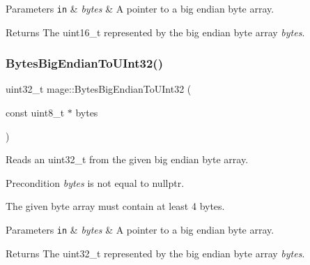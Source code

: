 \begin{DoxyParams}[1]{Parameters}
\mbox{\tt in}  & {\em bytes} & A pointer to a big endian byte array. \\
\hline
\end{DoxyParams}
\begin{DoxyReturn}{Returns}
The {\ttfamily uint16\+\_\+t} represented by the big endian byte array {\itshape bytes}. 
\end{DoxyReturn}
\hypertarget{namespacemage_ad7e69367e8054fba9854244270d955c9}{}\label{namespacemage_ad7e69367e8054fba9854244270d955c9} 
\subsubsection{\texorpdfstring{Bytes\+Big\+Endian\+To\+U\+Int32()}{BytesBigEndianToUInt32()}}
{\footnotesize\ttfamily uint32\+\_\+t mage\+::\+Bytes\+Big\+Endian\+To\+U\+Int32 (\begin{DoxyParamCaption}\item[{const uint8\+\_\+t $\ast$}]{bytes }\end{DoxyParamCaption})\hspace{0.3cm}{\ttfamily [noexcept]}}

Reads an uint32\+\_\+t from the given big endian byte array.

\begin{DoxyPrecond}{Precondition}
{\itshape bytes} is not equal to {\ttfamily nullptr}. 

The given byte array must contain at least 4 bytes. 
\end{DoxyPrecond}

\begin{DoxyParams}[1]{Parameters}
\mbox{\tt in}  & {\em bytes} & A pointer to a big endian byte array. \\
\hline
\end{DoxyParams}
\begin{DoxyReturn}{Returns}
The {\ttfamily uint32\+\_\+t} represented by the big endian byte array {\itshape bytes}. 
\end{DoxyReturn}
\hypertarget{namespacemage_a89df5661a1c0b04f6cacde99875cbd3c}{}\label{namespacemage_a89df5661a1c0b04f6cacde99875cbd3c} 

